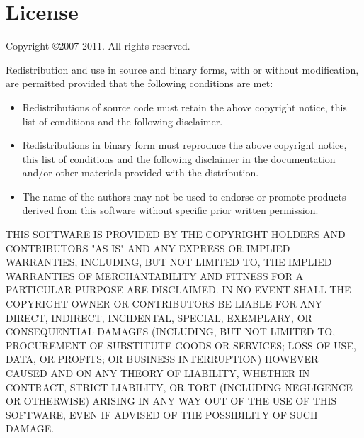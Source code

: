 \documentclass{article}
\begin{document}
\section{License}

\noindent Copyright \copyright 2007-2011. All rights reserved.

\noindent Redistribution and use in source and binary forms, with or without
modification, are permitted provided that the following conditions are
met:

\begin{itemize}
\item Redistributions of source code must retain the above copyright
notice, this list of conditions and the following disclaimer.

\item Redistributions in binary form must reproduce the above copyright
notice, this list of conditions and the following disclaimer in the
documentation and/or other materials provided with the distribution.

\item The name of the authors may not be used to  endorse or promote
products derived from this software without specific prior written
permission.
\end{itemize}

\noindent THIS SOFTWARE IS PROVIDED BY THE COPYRIGHT HOLDERS AND CONTRIBUTORS "AS
IS" AND ANY EXPRESS OR IMPLIED WAR\-RAN\-TIES, INCLUDING, BUT NOT LIMITED
TO, THE IMPLIED WARRANTIES OF MERCHANTABILITY AND FITNESS FOR A
PARTICULAR PURPOSE ARE DISCLAIMED. IN NO EVENT SHALL THE COPYRIGHT
OWNER OR CONTRIBUTORS BE LIABLE FOR ANY DIRECT, INDIRECT, INCIDENTAL,
SPECIAL, EXEMPLARY, OR CONSEQUENTIAL DAMAGES (INCLUDING, BUT NOT
LIMITED TO, PROCUREMENT OF SUBSTITUTE GOODS OR SERVICES; LOSS OF USE,
DATA, OR PROFITS; OR BUSINESS INTERRUPTION) HOWEVER CAUSED AND ON ANY
THEORY OF LIABILITY, WHETHER IN CONTRACT, STRICT LIABILITY, OR TORT
(INCLUDING NEGLIGENCE OR OTHERWISE) ARISING IN ANY WAY OUT OF THE USE
OF THIS SOFTWARE, EVEN IF ADVISED OF THE POSSIBILITY OF SUCH DAMAGE.


\end{document}
